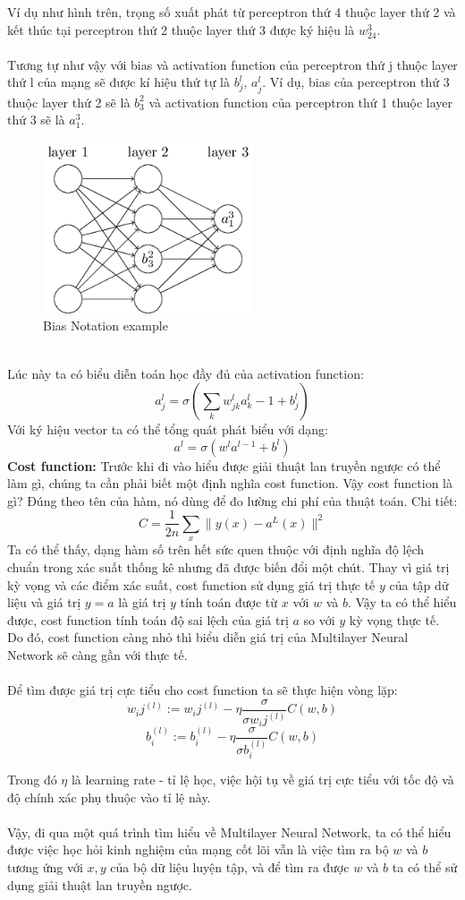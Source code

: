 Ví dụ như hình trên, trọng số xuất phát từ perceptron thứ 4 thuộc layer thứ 
2 và kết thúc tại perceptron thứ 2 thuộc layer thứ 3 được ký hiệu là 
$w_{24}^3$.\\\\
Tương tự như vậy với bias và activation function của perceptron thứ j thuộc layer 
thứ l của mạng sẽ được kí hiệu thứ tự là $b_j^l,\,a_j^l$. Ví dụ, bias của perceptron 
thứ 3 thuộc layer thứ 2 sẽ là $b_3^2$ và activation function của perceptron thứ 
1 thuộc layer thứ 3 sẽ là $a_1^3$.\\
\begin{figure}[h!]
\centering
\includegraphics[height=2in, keepaspectratio=true]{exb.png}
\caption{Bias Notation example}
\end{figure}\\
Lúc này ta có biểu diễn toán học đầy đủ của activation function:\\
\[
  a_j^l=\sigma(\sum_k w_{jk}^l a_k^l-1 + b_j^l)
\]
Với ký hiệu vector ta có thể tổng quát phát biểu với dạng:\\
\[
  a^l=\sigma(w^l a^{l-1} + b^l)
\]
\textbf{Cost function:} Trước khi đi vào hiểu được giải thuật lan truyền ngược 
có thể làm gì, chúng ta cần phải biết một định nghĩa cost function. Vậy cost 
function là gì? Đúng theo tên của hàm, nó dùng để đo lường chi phí của thuật toán. Chi tiết:\\
\[
  C=\frac{1}{2n}\sum_x\|y(x)-a^L(x)\|^2
\]
Ta có thể thấy, dạng hàm số trên hết sức quen thuộc với định nghĩa độ lệch chuẩn 
trong xác suất thống kê nhưng đã được biến đổi một chút. Thay vì giá trị kỳ vọng 
và các điểm xác suất, cost function sử dụng giá trị thực tế $y$ của tập dữ liệu 
và giá trị $y=a$ là giá trị $y$ tính toán được từ $x$ với $w$ và $b$. Vậy ta 
có thể hiểu được, cost function tính toán độ sai lệch của giá trị $a$ so với 
$y$ kỳ vọng thực tế. Do đó, cost function càng nhỏ thì biểu diễn giá trị của 
Multilayer Neural Network sẽ càng gần với thực tế.\\\\
Để tìm được giá trị cực tiểu cho cost function ta sẽ thực hiện vòng lặp:\\
\[
  w_ij^{(l)}:=w_ij^{(l)}-\eta\frac{\sigma}{\sigma w_ij^{(l)}}C(w,b)
\]
\[
  b_i^{(l)}:=b_i^{(l)}-\eta\frac{\sigma}{\sigma b_i^{(l)}}C(w,b)
\]

Trong đó $\eta$ là learning rate - tỉ lệ học, việc hội tụ về giá trị cực tiểu với 
tốc độ và độ chính xác phụ thuộc vào tỉ lệ này.\\\\
Vậy, đi qua một quá trình tìm hiểu về Multilayer Neural Network, ta có thể hiểu 
được việc học hỏi kinh nghiệm của mạng cốt lõi vẫn là việc tìm ra bộ $w$ và $b$ 
tương ứng với ${x, y}$ của bộ dữ liệu luyện tập, và để tìm ra được $w$ và $b$ 
ta có thể sử dụng giải thuật lan truyền ngược.